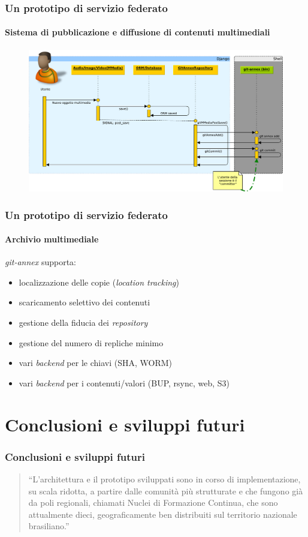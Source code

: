 \documentclass{beamer}
\begin{document}
{\begin{frame}
  \frametitle{Un prototipo di servizio federato}
  \framesubtitle{Sistema di pubblicazione e diffusione di contenuti multimediali}
	\begin{figure}
		\includegraphics[width=\textwidth]{./Figuras/SequenceDiagram_NuovoOggetto-crop.pdf}
	\end{figure}
\end{frame}

\begin{frame}
  \frametitle{Un prototipo di servizio federato}
  \framesubtitle{Archivio multimediale}
\emph{git-annex} supporta:
\begin{itemize}
\item localizzazione delle copie (\emph{location tracking})
\item scaricamento selettivo dei contenuti
\item gestione della fiducia dei \emph{repository}
\item gestione del numero di repliche minimo
\item vari \emph{backend} per le chiavi (SHA, WORM)
\item vari \emph{backend} per i contenuti/valori (BUP, rsync, web, S3)
\end{itemize}

\end{frame}

\section{Conclusioni e sviluppi futuri}

\begin{frame}
 \frametitle{Conclusioni e sviluppi futuri}
  \begin{quote}
    ``L'architettura e il prototipo sviluppati sono in corso di
    implementazione, su scala ridotta, a partire dalle comunità più
    strutturate e che fungono già da poli regionali, chiamati Nuclei
    di Formazione Continua, che sono attualmente dieci,
    geograficamente ben distribuiti sul territorio nazionale
    brasiliano.''
  \end{quote}
\end{frame}

}
\end{document}
